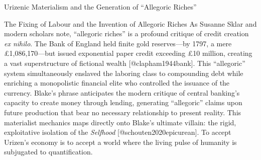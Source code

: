 \documentclass[
  ignorenonframetext,
]{beamer}
\begin{document}
\begin{frame}{Urizenic Materialism and the Generation of ``Allegoric
Riches''}
\begin{block}{The Fixing of Labour and the Invention of Allegoric
Riches}
As Susanne Sklar and modern scholars note, ``allegoric riches'' is a
profound critique of credit creation \emph{ex nihilo}. The Bank of
England held finite gold reserves---by 1797, a mere £1,086,170---but
issued exponential paper credit exceeding £10 million, creating a vast
superstructure of fictional wealth {[}@clapham1944bank{]}. This
``allegoric'' system simultaneously enslaved the laboring class to
compounding debt while enriching a monopolistic financial elite who
controlled the issuance of the currency. Blake's phrase anticipates the
modern critique of central banking's capacity to create money through
lending, generating ``allegoric'' claims upon future production that
bear no necessary relationship to present reality. This materialist
mechanics maps directly onto Blake's ultimate villain: the rigid,
exploitative isolation of the \emph{Selfhood}
{[}@schouten2020epicurean{]}. To accept Urizen's economy is to accept a
world where the living pulse of humanity is subjugated to
quantification.
\end{block}
\end{frame}
\end{document}

